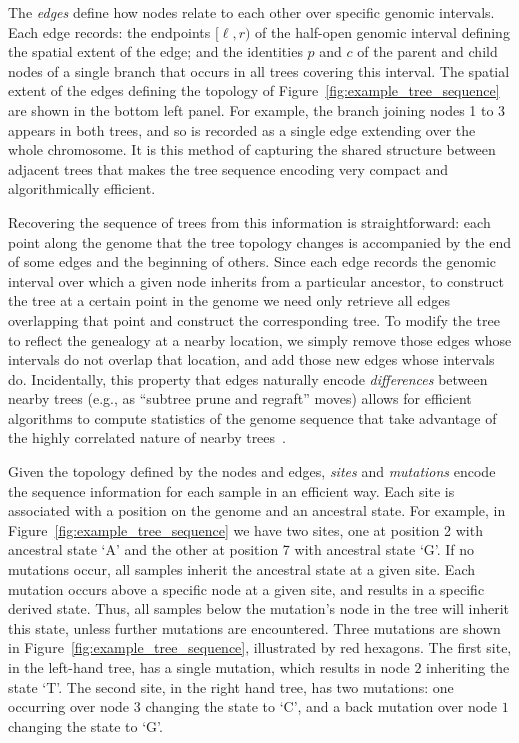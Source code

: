 \documentclass{article}
\begin{document}
The \emph{edges} define how nodes relate to each other over specific genomic intervals.
Each edge records:
the endpoints $[\ell, r)$ of the half-open genomic interval defining the
spatial extent of the edge;
and the identities $p$ and $c$ of the parent and child nodes
of a single branch that occurs in all trees covering this interval.
The spatial extent of the edges defining the topology of Figure~\ref{fig:example_tree_sequence}
are shown in the bottom left panel.
For example, the branch joining nodes 1 to 3 appears in both trees,
and so is recorded as a single edge extending over the whole chromosome.
It is this method of capturing the shared structure between adjacent trees that makes the
tree sequence encoding very compact and algorithmically efficient.

Recovering the sequence of trees from this information is straightforward:
each point along the genome that the tree topology changes
is accompanied by the end of some {edges} and the beginning of others.
Since each {edge} records the genomic interval
over which a given node inherits from a particular ancestor,
to construct the tree at a certain point in the genome
we need only retrieve all edges overlapping that point
and construct the corresponding tree.
To modify the tree to reflect the genealogy at a nearby location,
we simply remove those edges whose intervals do not overlap that location,
and add those new edges whose intervals do.
Incidentally, this property that edges naturally encode \emph{differences}
between nearby trees (e.g., as ``subtree prune and regraft'' moves)
allows for efficient algorithms to compute statistics of the genome sequence that take advantage
of the highly correlated nature of nearby trees~\citep{kelleher2016efficient}.

Given the topology defined by the nodes and edges, \emph{sites} and \emph{mutations}
encode the sequence information for each sample in an efficient way. Each site
is associated with a position on the genome and an ancestral state. For example,
in Figure~\ref{fig:example_tree_sequence} we have two sites, one at position
2 with ancestral state `A' and the other at position 7 with ancestral state `G'. If
no mutations occur, all samples inherit the ancestral state at a given site.
Each mutation occurs above a specific node at a given site,
and results in a specific derived state.
Thus, all samples below the mutation's node in the tree will inherit this state,
unless further mutations are encountered.
Three mutations are shown in Figure~\ref{fig:example_tree_sequence},
illustrated by red hexagons.
The first site, in the left-hand tree,
has a single mutation, which results in node $2$ inheriting the state `T'.
The second site, in the right hand tree, has two mutations:
one occurring over node $3$ changing the state to `C',
and a back mutation over node $1$ changing the state to `G'.
\end{document}
